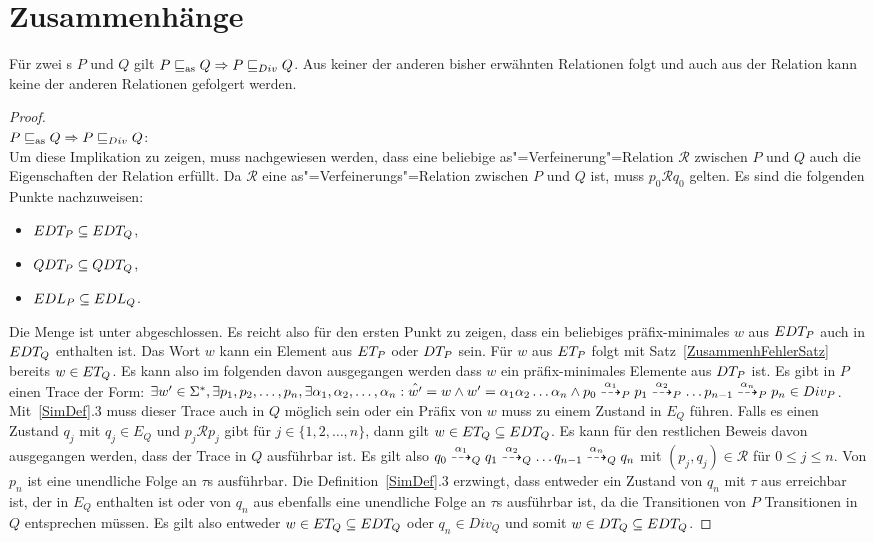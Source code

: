 \section{Zusammenhänge}

\begin{Satz}
  Für zwei \MEIO{}s $P$ und $Q$ gilt $P \sqsubseteq _{\mathrm{as}} Q \Rightarrow P  \sqsubseteq  _{Div} Q$. Aus
  keiner der anderen bisher erwähnten Relationen folgt \DRel{} und auch aus der
  Relation \DRel{} kann keine der anderen Relationen gefolgert werden.
\end{Satz}
\begin{proof}\mbox{}\\
  $P \sqsubseteq _{\mathrm{as}} Q \Rightarrow P  \sqsubseteq  _{Div} Q$:\\
  Um diese Implikation zu zeigen, muss nachgewiesen werden, dass eine beliebige
  as"=Verfeinerung"=Relation $\mathcal{R}$ zwischen $P$ und $Q$ auch die
  Eigenschaften der Relation \DRel{} erfüllt. Da $\mathcal{R}$ eine
  as"=Verfeinerungs"=Relation zwischen $P$ und $Q$ ist, muss $p_0 \mathcal{R}
  q_0$ gelten. Es sind die folgenden Punkte nachzuweisen:
  \begin{itemize}
    \item $EDT _P \subseteq EDT _Q$,
    \item $QDT _P \subseteq QDT _Q$,
    \item $EDL _P \subseteq EDL _Q$.
  \end{itemize}

  Die Menge \EDT{} ist unter \cont{} abgeschlossen. Es reicht also für den
  ersten Punkt zu zeigen, dass ein beliebiges präfix-minimales $w$ aus $EDT
  _P$ auch in $EDT _Q$ enthalten ist. Das Wort $w$ kann ein Element aus $ET
  _P$ oder $DT _P$ sein. Für $w$ aus $ET _P$ folgt mit
  Satz~\ref{ZusammenhFehlerSatz} bereits $w\in ET _Q$. Es kann also im
  folgenden davon ausgegangen werden dass $w$ ein präfix-minimales Elemente aus
  $DT _P$ ist. Es gibt in $P$ einen Trace der Form: $\exists w'\in\Sigma ^*,
  \exists p_1, p_2, \dots , p_n, \exists \alpha _1, \alpha _2, \dots ,\alpha
  _n: \hat{w'} = w \land w' = \alpha _1\alpha _2\dots\alpha _n \land p_0
  \may[\alpha _1]_P p_1 \may[\alpha _2]_P \dots p_{n-1} \may[\alpha _n]_P p_n
  \in Div _P$. Mit~\ref{SimDef}.3 muss dieser Trace auch in $Q$ möglich sein
  oder ein Präfix von $w$ muss zu einem Zustand in $E_Q$ führen. Falls es einen
  Zustand $q_j$ mit $q_j\in E_Q$ und $p_j \mathcal{R} p_j$ gibt für
  $j\in\{1,2,\dots ,n\}$, dann gilt $w\in ET _Q \subseteq EDT _Q$. Es kann
  für den restlichen Beweis davon ausgegangen werden, dass der Trace in $Q$
  ausführbar ist. Es gilt also $q_0 \may[\alpha _1]_Q q_1 \may[\alpha _2]_Q
  \dots q_{n-1} \may[\alpha _n]_Q q_n$ mit $(p_j,q_j)\in\mathcal{R}$ für $0\leq
  j \leq n$. Von $p_n$ ist eine unendliche Folge an $\tau$s ausführbar. Die
  Definition~\ref{SimDef}.3 erzwingt, dass entweder ein Zustand von $q_n$ mit
  $\tau$ aus erreichbar ist, der in $E_Q$ enthalten ist oder von $q_n$ aus
  ebenfalls eine unendliche Folge an $\tau$s ausführbar ist, da die
  Transitionen von $P$ Transitionen in $Q$ entsprechen müssen. Es gilt also
  entweder $w\in ET _Q\subseteq EDT _Q$ oder $q_n\in Div _Q$ und somit $w\in DT
  _Q\subseteq EDT _Q$.


\end{proof}
